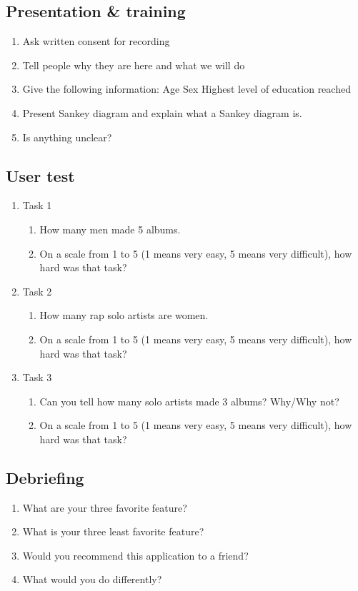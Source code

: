 \documentclass[a4paper, 11pt, oneside]{article}
\begin{document}
\subsection{Presentation \& training}
\begin{enumerate}
    \item Ask written consent for recording
    \item Tell people why they are here and what we will do
    \item Give the following information:
          \subitem Age
          \subitem Sex
          \subitem Highest level of education reached
    \item Present Sankey diagram and explain what a Sankey diagram is.
    \item Is anything unclear?
\end{enumerate}

\subsection{User test}
\begin{enumerate}
    \item Task 1
          \begin{enumerate}
              \item How many men made 5 albums.
              \item On a scale from 1 to 5 (1 means very easy, 5 means very difficult), how hard was that task?
          \end{enumerate}
    \item Task 2
          \begin{enumerate}
              \item How many rap solo artists are women.
              \item On a scale from 1 to 5 (1 means very easy, 5 means very difficult), how hard was that task?
          \end{enumerate}
    \item Task 3
          \begin{enumerate}
              \item Can you tell how many solo artists made 3 albums? Why/Why not?
              \item On a scale from 1 to 5 (1 means very easy, 5 means very difficult), how hard was that task?
          \end{enumerate}
\end{enumerate}

\subsection{Debriefing}
\begin{enumerate}
    \item What are your three favorite feature?
    \item What is your three least favorite feature?
    \item Would you recommend this application to a friend?
    \item What would you do differently?
\end{enumerate}
\end{document}
